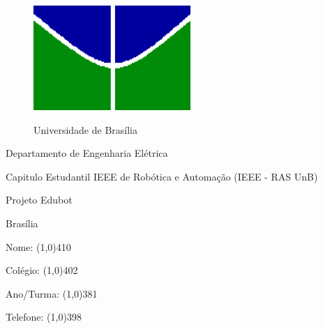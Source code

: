 \begin{figure}[h!]
    \centering
    \includegraphics[scale=0.9]{Figuras/simb_unb.png}
    \label{fig:unb}
    \caption*{Universidade de Brasília}
\end{figure}

\begin{center}
    Departamento de Engenharia Elétrica
    
    Capitulo Estudantil IEEE de Robótica e Automação (IEEE - RAS UnB)
    
    Projeto Edubot
    
    \vfill
    
    \Huge \bf \thetitle
    
    \vfill
    
    \large %
    
    Brasília \\
    \the\year %
    
    \thispagestyle{empty} %
\end{center}

\newpage

\noindent Nome:
    \line(1,0){410}
    \vspace{0.3cm}
    
\noindent Colégio:
    \line(1,0){402}
    \vspace{0.3cm}
    
\noindent Ano/Turma:
    \line(1,0){381}
    \vspace{0.3cm}
    
\noindent Telefone:
    \line(1,0){398}
    \vspace{0.3cm}  

\newpage

\setcounter{tocdepth}{2}
\tableofcontents




